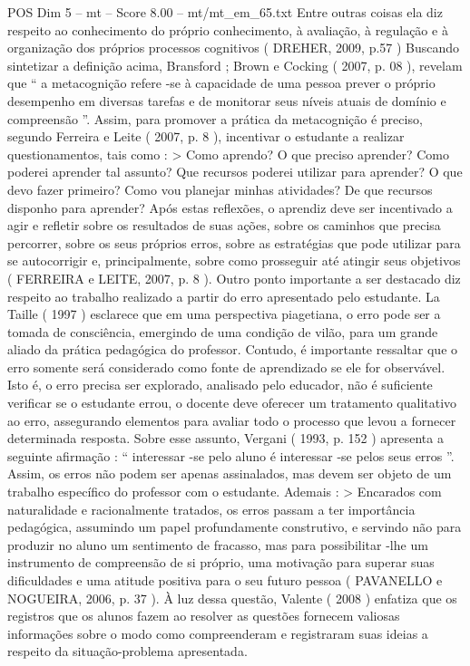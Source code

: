 \begin{textsample}{POS Dim 5 – mt – Score 8.00 – mt/mt\_em\_65.txt}
Entre outras coisas ela diz respeito ao conhecimento do próprio conhecimento, à avaliação, à regulação e à organização dos próprios processos cognitivos ( DREHER, 2009, p.57 ) Buscando sintetizar a definição acima, Bransford ; Brown e Cocking ( 2007, p. 08 ), revelam que “ a metacognição refere -se à capacidade de uma pessoa prever o próprio desempenho em diversas tarefas e de monitorar seus níveis atuais de domínio e compreensão ”.
Assim, para promover a prática da metacognição é preciso, segundo Ferreira e Leite ( 2007, p. 8 ), incentivar o estudante a realizar questionamentos, tais como : > Como aprendo?
O que preciso aprender?
Como poderei aprender tal assunto?
Que recursos poderei utilizar para aprender?
O que devo fazer primeiro?
Como vou planejar minhas atividades?
De que recursos disponho para aprender?
Após estas reflexões, o aprendiz deve ser incentivado a agir e refletir sobre os resultados de suas ações, sobre os caminhos que precisa percorrer, sobre os seus próprios erros, sobre as estratégias que pode utilizar para se autocorrigir e, principalmente, sobre como prosseguir até atingir seus objetivos ( FERREIRA e LEITE, 2007, p. 8 ).
Outro ponto importante a ser destacado diz respeito ao trabalho realizado a partir do erro apresentado pelo estudante.
La Taille ( 1997 ) esclarece que em uma perspectiva piagetiana, o erro pode ser a tomada de consciência, emergindo de uma condição de vilão, para um grande aliado da prática pedagógica do professor.
Contudo, é importante ressaltar que o erro somente será considerado como fonte de aprendizado se ele for observável.
Isto é, o erro precisa ser explorado, analisado pelo educador, não é suficiente verificar se o estudante errou, o docente deve oferecer um tratamento qualitativo ao erro, assegurando elementos para avaliar todo o processo que levou a fornecer determinada resposta.
Sobre esse assunto, Vergani ( 1993, p. 152 ) apresenta a seguinte afirmação : “ interessar -se pelo aluno é interessar -se pelos seus erros ”.
Assim, os erros não podem ser apenas assinalados, mas devem ser objeto de um trabalho específico do professor com o estudante.
Ademais : > Encarados com naturalidade e racionalmente tratados, os erros passam a ter importância pedagógica, assumindo um papel profundamente construtivo, e servindo não para produzir no aluno um sentimento de fracasso, mas para possibilitar -lhe um instrumento de compreensão de si próprio, uma motivação para superar suas dificuldades e uma atitude positiva para o seu futuro pessoa ( PAVANELLO e NOGUEIRA, 2006, p. 37 ).
À luz dessa questão, Valente ( 2008 ) enfatiza que os registros que os alunos fazem ao resolver as questões fornecem valiosas informações sobre o modo como compreenderam e registraram suas ideias a respeito da situação-problema apresentada.

\end{textsample}
